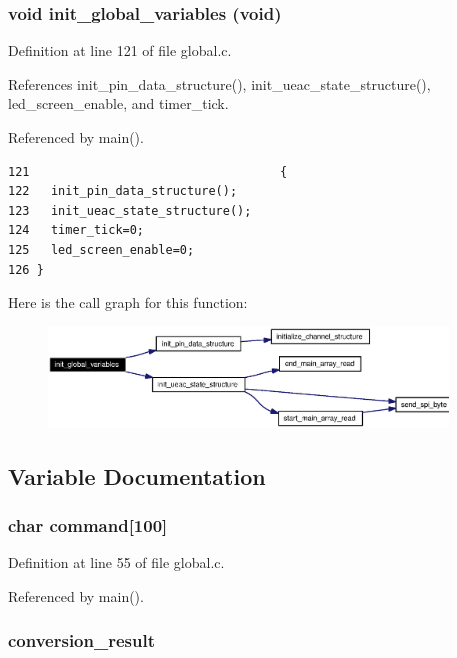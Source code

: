 \subsubsection{\setlength{\rightskip}{0pt plus 5cm}void init\_\-global\_\-variables (void)}\label{global_8h_a7}




Definition at line 121 of file global.c.

References init\_\-pin\_\-data\_\-structure(), init\_\-ueac\_\-state\_\-structure(), led\_\-screen\_\-enable, and timer\_\-tick.

Referenced by main().

\footnotesize\begin{verbatim}121                                   {
122   init_pin_data_structure();   
123   init_ueac_state_structure();
124   timer_tick=0;
125   led_screen_enable=0;
126 }
\end{verbatim}\normalsize 




Here is the call graph for this function:\begin{figure}[H]
\begin{center}
\leavevmode
\includegraphics[width=301pt]{global_8h_a7_cgraph}
\end{center}
\end{figure}


\subsection{Variable Documentation}
\subsubsection{\setlength{\rightskip}{0pt plus 5cm}char {\bf command}[100]}\label{global_8h_a1}




Definition at line 55 of file global.c.

Referenced by main().
\subsubsection{ {\bf conversion\_\-result}}\label{global_8h_a3}




